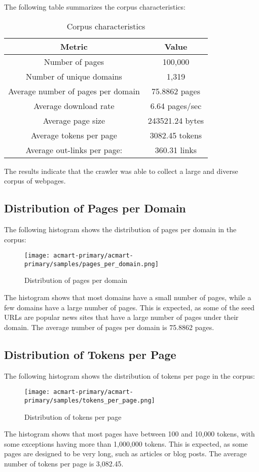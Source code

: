 \documentclass[sigconf]{acmart}
\begin{document}
The following table summarizes the corpus characteristics:
\begin{table}[H]
\centering
\begin{tabular}{|c|c|}
\hline
\textbf{Metric} & \textbf{Value} \\ \hline
Number of pages & 100,000 \\ \hline
Number of unique domains & 1,319 \\ \hline
Average number of pages per domain & 75.8862 pages\\ \hline
Average download rate & 6.64 pages/sec\\ \hline
Average page size & 243521.24 bytes \\ \hline
Average tokens per page & 3082.45 tokens \\ \hline
Average out-links per page: &  360.31 links \\ \hline
\end{tabular}
\caption{Corpus characteristics}
\label{tab:corpus}
\end{table}
The results indicate that the crawler was able to collect a large and diverse corpus of webpages.

\subsection{Distribution of Pages per Domain}
The following histogram shows the distribution of pages per domain in the corpus:
\begin{figure}[H]
\centering
\texttt{[image: acmart-primary/acmart-primary/samples/pages\_per\_domain.png]}
\caption{Distribution of pages per domain}
\label{fig:histogram}
\end{figure}
The histogram shows that most domains have a small number of pages, while a few domains have a large number of pages. This is expected, as some of the seed URLs are popular news sites that have a large number of pages under their domain. The average number of pages per domain is 75.8862 pages.

\subsection{Distribution of Tokens per Page}
The following histogram shows the distribution of tokens per page in the corpus:
\begin{figure}[H]
\centering
\texttt{[image: acmart-primary/acmart-primary/samples/tokens\_per\_page.png]}
\caption{Distribution of tokens per page}
\label{fig:histogram_tokens}
\end{figure}
The histogram shows that most pages have between 100 and 10,000 tokens, with some exceptions having more than 1,000,000 tokens. This is expected, as some pages are designed to be very long, such as articles or blog posts. The average number of tokens per page is 3,082.45.
\end{document}
